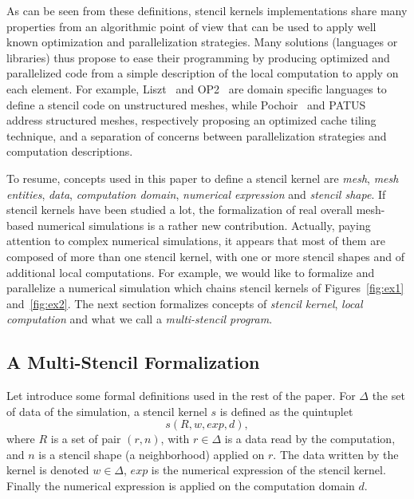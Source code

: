 As can be seen from these definitions, stencil kernels implementations share many properties from an algorithmic point of view that can be used to apply well known optimization and parallelization strategies.
Many solutions (languages or libraries) thus propose to ease their programming by producing optimized and parallelized code from a simple description of the local computation to apply on each element.
For example, Liszt~\cite{DeVito2011LDS} and OP2~\cite{Giles2011} are domain specific languages to define a stencil code on unstructured meshes, while Pochoir~\cite{spaaTangCKLL11} and PATUS~\cite{citeulike12258902} address structured meshes, respectively proposing an optimized cache tiling technique, and a separation of concerns between parallelization strategies and computation descriptions.

To resume, concepts used in this paper to define a stencil kernel are \emph{mesh}, \emph{mesh entities}, \emph{data}, \emph{computation domain}, \emph{numerical expression} and \emph{stencil shape}. 
If stencil kernels have been studied a lot, the formalization of real overall mesh-based numerical simulations is a rather new contribution. Actually, paying attention to complex numerical simulations, it appears that most of them are composed of more than one stencil kernel, with one or more stencil shapes and of additional local computations. For example, we would like to formalize and parallelize a numerical simulation which chains stencil kernels of Figures~\ref{fig:ex1} and~\ref{fig:ex2}. The next section formalizes concepts of \emph{stencil kernel}, \emph{local computation} and what we call a \emph{multi-stencil program}.

\subsection{A Multi-Stencil Formalization}
\label{sect:multistencil}
Let introduce some formal definitions used in the rest of the paper.
For $\Delta$ the set of data of the simulation, a stencil kernel $s$ is defined as the quintuplet
\begin{equation} 
s(R,w,exp,d),
\label{eq:st}
\end{equation}
where $R$ is a set of pair $(r,n)$, with $r \in \Delta$ is a data read by the computation, and $n$ is a stencil shape (a neighborhood) applied on $r$. The data written by the kernel is denoted $w \in \Delta$, $exp$ is the numerical expression of the stencil kernel. Finally the numerical expression is applied on the computation domain $d$.

